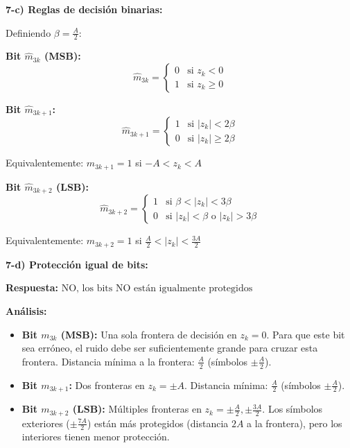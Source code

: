 \documentclass[11pt,a4paper]{article}
\begin{document}
\textbf{7-c) Reglas de decisi\'on binarias:}

Definiendo $\beta = \frac{A}{2}$:

\textbf{Bit $\hat{m}_{3k}$ (MSB):}
\[
\boxed{\hat{m}_{3k} = \begin{cases}
0 & \text{si } z_k < 0 \\
1 & \text{si } z_k \geq 0
\end{cases}}
\]

\textbf{Bit $\hat{m}_{3k+1}$:}
\[
\boxed{\hat{m}_{3k+1} = \begin{cases}
1 & \text{si } |z_k| < 2\beta \\
0 & \text{si } |z_k| \geq 2\beta
\end{cases}}
\]

Equivalentemente: $\hat{m}_{3k+1} = 1$ si $-A < z_k < A$

\textbf{Bit $\hat{m}_{3k+2}$ (LSB):}
\[
\boxed{\hat{m}_{3k+2} = \begin{cases}
1 & \text{si } \beta < |z_k| < 3\beta \\
0 & \text{si } |z_k| < \beta \text{ o } |z_k| > 3\beta
\end{cases}}
\]

Equivalentemente: $\hat{m}_{3k+2} = 1$ si $\frac{A}{2} < |z_k| < \frac{3A}{2}$

\textbf{7-d) Protecci\'on igual de bits:}

\textbf{Respuesta:} $\boxed{\text{NO, los bits NO est\'an igualmente protegidos}}$

\textbf{An\'alisis:}

\begin{itemize}
    \item \textbf{Bit $m_{3k}$ (MSB):} Una sola frontera de decisi\'on en $z_k = 0$. Para que este bit sea err\'oneo, el ruido debe ser suficientemente grande para cruzar esta frontera. Distancia m\'inima a la frontera: $\frac{A}{2}$ (s\'imbolos $\pm\frac{A}{2}$).
    
    \item \textbf{Bit $m_{3k+1}$:} Dos fronteras en $z_k = \pm A$. Distancia m\'inima: $\frac{A}{2}$ (s\'imbolos $\pm\frac{A}{2}$).
    
    \item \textbf{Bit $m_{3k+2}$ (LSB):} M\'ultiples fronteras en $z_k = \pm\frac{A}{2}, \pm\frac{3A}{2}$. Los s\'imbolos exteriores ($\pm\frac{7A}{2}$) est\'an m\'as protegidos (distancia $2A$ a la frontera), pero los interiores tienen menor protecci\'on.
\end{itemize}
\end{document}
